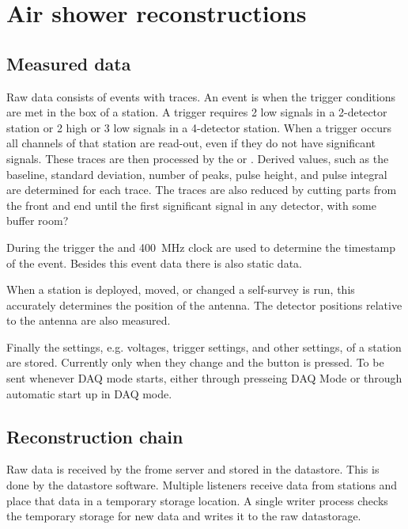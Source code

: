 \chapter{Air shower reconstructions}
\label{ch:analysis}


\section{Measured data}

Raw data consists of events with traces. An event is when the trigger
conditions are met in the \hisparc box of a station. A trigger requires
2 low signals in a 2-detector station or 2 high or 3 low signals in a
4-detector station. When a trigger occurs all \pmt channels of that
station are read-out, even if they do not have significant signals.
These traces are then processed by the \daq or \pysparc. Derived
values, such as the baseline, standard deviation, number of peaks,
pulse height, and pulse integral are determined for each trace. The traces
are also reduced by cutting parts from the front and end until the first
significant signal in any detector, with some buffer room?

During the trigger the \gps and \SI{400}{\mega\hertz} clock are used to
determine the \gps timestamp of the event. Besides this event data there
is also static data.

When a station is deployed, moved, or changed a \gps self-survey is run,
this accurately determines the position of the \gps antenna. The
detector positions relative to the \gps antenna are also measured.

Finally the settings, e.g. \pmt voltages, trigger settings, and other settings,
of a station are stored. Currently only when they change and the button is
pressed. To be sent whenever DAQ mode starts, either through presseing DAQ Mode
or through automatic start up in DAQ mode. 



\section{Reconstruction chain}

Raw data is received by the frome server and stored in the \hisparc
datastore. This is done by the datastore software. Multiple listeners
receive data from stations and place that data in a temporary storage
location. A single writer process checks the temporary storage for new
data and writes it to the raw datastorage.


